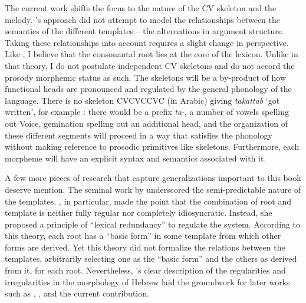 \begin{exe}
\begin{xlist}
\begin{exe}
\begin{exe}
\begin{exe}
\begin{exe}
\begin{xlist}
\begin{exe}
\begin{xlist}
\begin{xlist}
\begin{xlist}
\begin{exe}
\begin{xlist}
\begin{exe}
\begin{exe}
The current work shifts the focus to the nature of the CV skeleton and the melody. \citeauthor{jjmcc81}'s approach did not attempt to model the relationships between the semantics of the different templates -- the alternations in argument structure. 
Taking these relationships into account requires a slight change in perspective. Like \cite{jjmcc81}, I believe that the consonantal root lies at the core of the lexicon. Unlike in that theory, I do not postulate independent CV skeletons and do not accord the prosody morphemic status as such. The skeletons will be a by-product of how functional heads are pronounced and regulated by the general phonology of the language. There is no skeleton CVCVCCVC (in Arabic) giving \emph{takattab} `got written', for example \citep[392]{jjmcc81}: there would be a prefix \emph{ta}-, a number of vowels spelling out Voice, gemination spelling out an additional head, and the organization of these different segments will proceed in a way that satisfies the phonology without making reference to prosodic primitives like skeletons. Furthermore, each morpheme will have an explicit syntax and semantics associated with it.

A few more pieces of research that capture generalizations important to this book deserve mention. The seminal work by \cite{berman78} underscored the semi-predictable nature of the templates. \citet[Ch.~3]{berman78}, in particular, made the point that the combination of root and template is neither fully regular nor completely idiosyncratic. Instead, she proposed a principle of ``lexical redundancy'' to regulate the system. According to this theory, each root has a ``basic form'' in some template from which other forms are derived. Yet this theory did not formalize the relations between the templates, arbitrarily selecting one as the ``basic form'' and the others as derived from it, for each root. Nevertheless, \citeauthor{berman78}'s clear description of the regularities and irregularities in the morphology of Hebrew laid the groundwork for later works such as \cite{doron03}, \cite{arad05}, \cite{borer13oup} and the current contribution.


\end{exe}
\end{exe}
\end{xlist}
\end{exe}
\end{xlist}
\end{xlist}
\end{xlist}
\end{exe}
\end{xlist}
\end{exe}
\end{exe}
\end{exe}
\end{exe}
\end{xlist}
\end{exe}
